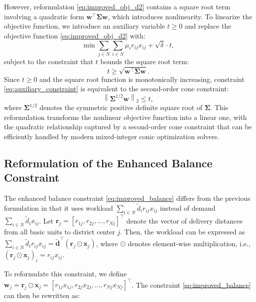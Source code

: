 \documentclass[preprint,12pt,authoryear]{elsarticle}
\begin{document}
However, reformulation \eqref{eq:improved_obj_d2} contains a square root term involving a quadratic form $\mathbf{w}^\top \boldsymbol{\Sigma} \mathbf{w}$, which introduces nonlinearity. To linearize the objective function, we introduce an auxiliary variable $t \geqslant 0$ and replace the objective function \eqref{eq:improved_obj_d2} with:
\begin{equation}
\min \sum_{j \in N} \sum_{i \in N} \mu_i r_{ij} x_{ij} + \sqrt{\delta} \cdot t, \label{eq:improved_obj_d2_linear}
\end{equation}
subject to the constraint that $t$ bounds the square root term:
\begin{equation}
t \geqslant \sqrt{\mathbf{w}^\top \boldsymbol{\Sigma} \mathbf{w}}. \label{eq:auxiliary_constraint}
\end{equation}
Since $t \geqslant 0$ and the square root function is monotonically increasing, constraint \eqref{eq:auxiliary_constraint} is equivalent to the second-order cone constraint:
\begin{equation}
\left\|\boldsymbol{\Sigma}^{1/2} \mathbf{w}\right\|_2 \leqslant t, \label{eq:soc_constraint}
\end{equation}
where $\boldsymbol{\Sigma}^{1/2}$ denotes the symmetric positive definite square root of $\boldsymbol{\Sigma}$. This reformulation transforms the nonlinear objective function into a linear one, with the quadratic relationship captured by a second-order cone constraint that can be efficiently handled by modern mixed-integer conic optimization solvers.

\subsection{Reformulation of the Enhanced Balance Constraint}

The enhanced balance constraint \eqref{eq:improved_balance} differs from the previous formulation in that it uses workload $\sum_{i \in N} \widetilde{d}_i r_{ij} x_{ij}$ instead of demand $\sum_{i \in N} \widetilde{d}_i x_{ij}$. Let $\mathbf{r}_j = [r_{1j}, r_{2j}, \ldots, r_{Nj}]^\top$ denote the vector of delivery distances from all basic units to district center $j$. Then, the workload can be expressed as $\sum_{i \in N} \widetilde{d}_i r_{ij} x_{ij} = \widetilde{\mathbf{d}}^\top (\mathbf{r}_j \odot \mathbf{x}_j)$, where $\odot$ denotes element-wise multiplication, i.e., $(\mathbf{r}_j \odot \mathbf{x}_j)_i = r_{ij} x_{ij}$.

To reformulate this constraint, we define $\mathbf{w}_j = \mathbf{r}_j \odot \mathbf{x}_j = [r_{1j} x_{1j}, r_{2j} x_{2j}, \ldots, r_{Nj} x_{Nj}]^\top$. The constraint \eqref{eq:improved_balance} can then be rewritten as:
\end{document}

